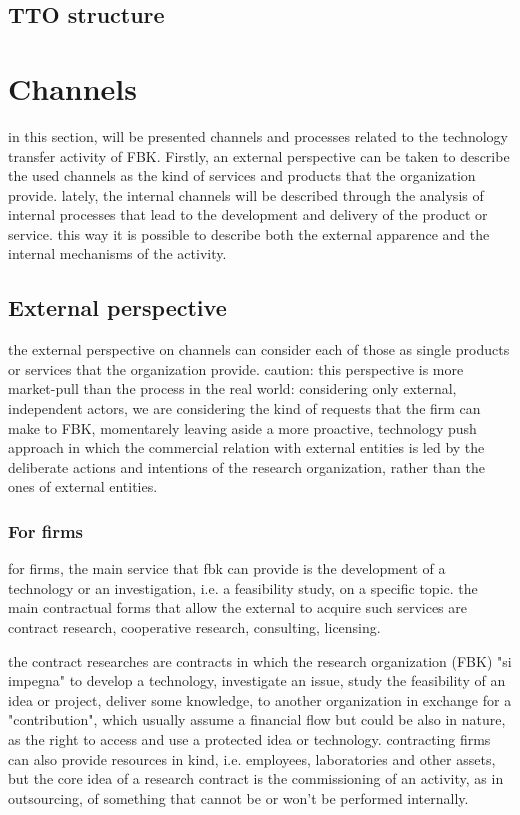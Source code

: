 \subsection{TTO structure}

\section{Channels}

in this section, will be presented channels and processes related to the technology transfer activity of FBK. Firstly, an external perspective can be taken to describe the used channels as the kind of services and products that the organization provide. lately, the internal channels will be described through the analysis of internal processes that lead to the development and delivery of the product or service. this way it is possible to describe both the external apparence and the internal mechanisms of the activity. 

\subsection{External perspective}

the external perspective on channels can consider each of those as single products or services that the organization provide. caution: this perspective is more market-pull than the process in the real world: considering only external, independent actors, we are considering the kind of requests that the firm can make to FBK, momentarely leaving aside a more proactive, technology push approach in which the commercial relation with external entities is led by the deliberate actions and intentions of the research organization, rather than the ones of external entities.

\subsubsection{For firms}

for firms, the main service that fbk can provide is the development of a technology or an investigation, i.e. a feasibility study, on a specific topic. the main contractual forms that allow the external to acquire such services are contract research, cooperative research, consulting, licensing. 

the contract researches are contracts in which the research organization (FBK) "si impegna" to develop a technology, investigate an issue, study the feasibility of an idea or project, deliver some knowledge, to another organization in exchange for a "contribution", which usually assume a financial flow but could be also in nature, as the right to access and use a protected idea or technology. contracting firms can also provide resources in kind, i.e. employees, laboratories and other assets, but the core idea of a research contract is the commissioning of an activity, as in outsourcing, of something that cannot be or won't be performed internally.

